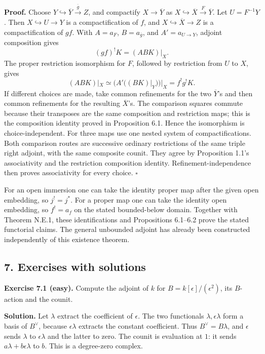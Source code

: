 \documentclass[11pt]{article}
\begin{document}
\textbf{Proof.} Choose
\(Y\hookrightarrow\overline Y\xrightarrow{\overline g}Z\), and
compactify \(X\to\overline Y\) as
\(X\hookrightarrow\overline X\xrightarrow{F}\overline Y\). Let
\(U=F^{-1}Y\). Then \(X\hookrightarrow U\to Y\) is a compactification of
\(f\), and \(X\hookrightarrow\overline X\to Z\) is a compactification of
\(gf\). With \(A=a_F\), \(B=a_{\overline g}\), and \(A'=a_{U\to Y}\),
adjoint composition gives \[
(gf)^!K=(ABK)|_X.
\] The proper restriction isomorphism for \(F\), followed by restriction
from \(U\) to \(X\), gives \[
(ABK)|_X\simeq (A'((BK)|_Y))|_X=f^!g^!K.
\] If different choices are made, take common refinements for the two
\(\overline Y\)'s and then common refinements for the resulting
\(\overline X\)'s. The comparison squares commute because their
transposes are the same composition and restriction maps; this is the
composition identity proved in Proposition 6.1. Hence the isomorphism is
choice-independent. For three maps use one nested system of
compactifications. Both comparison routes are successive ordinary
restrictions of the same triple right adjoint, with the same composite
counit. They agree by Proposition 1.1's associativity and the
restriction composition identity. Refinement-independence then proves
associativity for every choice. \(\square\)

For an open immersion one can take the identity proper map after the
given open embedding, so \(j^!=j^*\). For a proper map one can take the
identity open embedding, so \(f^!=a_f\) on the stated bounded-below
domain. Together with Theorem N.E.1, these identifications and
Propositions 6.1--6.2 prove the stated functorial claims. The general
unbounded adjoint has already been constructed independently of this
existence theorem.

\subsection{7. Exercises with
solutions}\label{exercises-with-solutions-14}

\textbf{Exercise 7.1 (easy).} Compute the adjoint of \(k\) for
\(B=k[\epsilon]/(\epsilon^2)\), its \(B\)-action and the counit.

\textbf{Solution.} Let \(\lambda\) extract the coefficient of
\(\epsilon\). The two functionals \(\lambda,\epsilon\lambda\) form a
basis of \(B^\vee\), because \(\epsilon\lambda\) extracts the constant
coefficient. Thus \(B^\vee=B\lambda\), and \(\epsilon\) sends
\(\lambda\) to \(\epsilon\lambda\) and the latter to zero. The counit is
evaluation at \(1\): it sends \(a\lambda+b\epsilon\lambda\) to \(b\).
This is a degree-zero complex.
\end{document}
